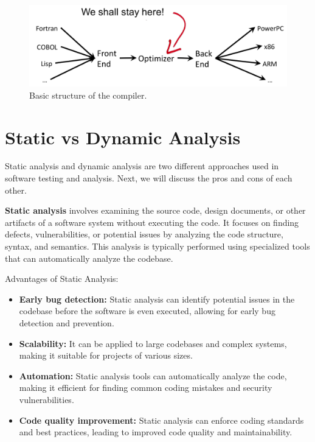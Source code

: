 \begin{figure}[ht]
    \centering
    \includegraphics[width=\textwidth]{images/compiler.png}
    \caption{Basic structure of the compiler.}
    \label{fig:compiler}
\end{figure}

\section{Static vs Dynamic Analysis}
\label{sec:analysis}

Static analysis and dynamic analysis are two different approaches used in software testing and analysis. Next, we will discuss the pros and cons of each other.

\textbf{Static analysis} involves examining the source code, design documents, or other artifacts of a software system without executing the code. It focuses on finding defects, vulnerabilities, or potential issues by analyzing the code structure, syntax, and semantics. This analysis is typically performed using specialized tools that can automatically analyze the codebase.

Advantages of Static Analysis:

\begin{itemize}
    \item \textbf{Early bug detection:} Static analysis can identify potential issues in the codebase before the software is even executed, allowing for early bug detection and prevention.
    \item \textbf{Scalability:} It can be applied to large codebases and complex systems, making it suitable for projects of various sizes.
    \item \textbf{Automation:} Static analysis tools can automatically analyze the code, making it efficient for finding common coding mistakes and security vulnerabilities.
    \item \textbf{Code quality improvement:} Static analysis can enforce coding standards and best practices, leading to improved code quality and maintainability.
\end{itemize}

